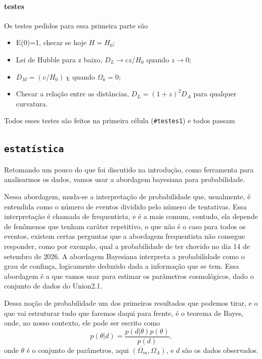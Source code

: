 \documentclass[11pt,a4paper]{article}
\newcommand{\Om}{\Omega_m}
\newcommand{\OL}{\Omega_\Lambda}
\newcommand{\Ok}{\Omega_k}
\begin{document}
\paragraph{testes}

Os testes pedidos para essa primeira parte são 
\begin{itemize}
  \item E(0)=1, checar se hoje $H=H_0$;
  \item Lei de Hubble para z baixo, $D_L \to cz/H_0$ quando $z \to 0$;
  \item $D_M = (c/H_0)\,\chi$ quando $\Ok = 0$;
  \item Checar a relação entre as distâncias, $D_L = (1+z)^2 D_A$ para qualquer curvatura.
\end{itemize}
Todos esses testes são feitos na primeira célula (\texttt{\#testes1}) e todos passam 


\subsection{\texttt{estatística}}
\label{sec:bayes}

Retomando um pouco do que foi discutido na introdução, como ferramenta para analisarmos os dados, vamos usar a abordagem bayesiana para probabilidade.

Nessa abordagem, muda-se a interpretação de probabilidade que, usualmente, é entendida como o número de eventos dividido pelo número de tentativas.
Essa interpretação é chamada de frequentista, e é a mais comum, contudo, ela depende de fenômenos que tenham caráter repetitivo, o que não
é o caso para todos os eventos, existem certas perguntas que a abordagem frequentista não consegue responder, como por exemplo, 
qual a probabilidade de ter chovido no dia 14 de setembro de 2026. A abordagem Bayesiana interpreta a probabilidade como o grau de confinça, logicamente deduzido
dada a informação que se tem. Essa abordagem é a que vamos usar para estimar os parâmetros cosmológicos, dado o conjunto de dados do Union2.1.

Dessa noção de probabilidade um dos primeiros resultados que podemos tirar, e o que vai estruturar tudo que faremos daqui para frente, é o teorema
de Bayes, onde, no nosso contexto, ele pode ser escrito como
\begin{equation}
  p(\theta|d)=\frac{p(d|\theta)p(\theta)}{p(d)},
\end{equation}
onde $\theta$ é o conjunto de parâmetros, aqui $(\Om,\OL)$, e $d$ são os dados observados.
\end{document}

